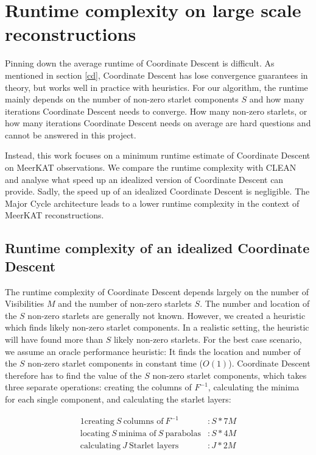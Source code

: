 \section{Runtime complexity on large scale reconstructions}
Pinning down the average runtime of Coordinate Descent is difficult. As mentioned in section \ref{cd}, Coordinate Descent has lose convergence guarantees in theory, but works well in practice with heuristics. For our algorithm, the runtime mainly depends on the number of non-zero starlet components $S$ and how many iterations Coordinate Descent needs to converge. How many non-zero starlets, or how many iterations Coordinate Descent needs on average are hard questions and cannot be answered in this project.

Instead, this work focuses on a minimum runtime estimate of Coordinate Descent on MeerKAT observations. We compare the runtime complexity with CLEAN and analyse what speed up an idealized version of Coordinate Descent can provide. Sadly, the speed up of an idealized Coordinate Descent is negligible. The Major Cycle architecture leads to a lower runtime complexity in the context of MeerKAT reconstructions.


\subsection{Runtime complexity of an idealized Coordinate Descent}
The runtime complexity of Coordinate Descent depends largely on the number of Visibilities $M$ and the number of non-zero starlets $S$. The number and location of the $S$ non-zero starlets are generally not known. However, we created a heuristic which finds likely non-zero starlet components. In a realistic setting, the heuristic will have found more than $S$ likely non-zero starlets. For the best case scenario, we assume an oracle performance heuristic: It finds the location and number of the $S$ non-zero starlet components in constant time ($O(1)$). Coordinate Descent therefore has to find the value of the $S$ non-zero starlet components, which takes three separate operations: creating the columns of $F^{-1}$, calculating the minima for each single component, and calculating the starlet layers:

\begin{alignat*}{1}
\text{creating} \:S\: \text{columns of}\: F^{-1} &: S*7M\\
\text{locating} \:S\: \text{minima of} \:S\: \text{parabolas} &: S*4M\\
\text{calculating} \:J\: \text{Starlet layers} &: J * 2M
\end{alignat*}

